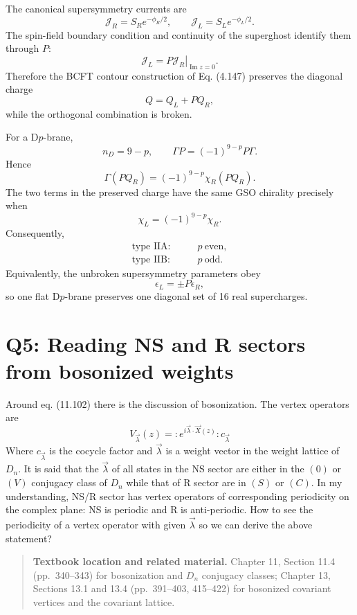 \documentclass[
  10pt,
  a4paper,
  openany]{book}
\begin{document}
The canonical supersymmetry currents are \[
\mathcal J_R=S_R e^{-\phi_R/2},
\qquad
\mathcal J_L=S_L e^{-\phi_L/2}.
\] The spin-field boundary condition and continuity of the superghost
identify them through \(P\): \[
\left.
\mathcal J_L
=P\mathcal J_R
\right|_{\operatorname{Im}z=0}.
\] Therefore the BCFT contour construction of Eq. (4.147) preserves the
diagonal charge \[
\boxed{
Q=Q_L+P Q_R,
}
\] while the orthogonal combination is broken.

For a D\(p\)-brane, \[
n_D=9-p,
\qquad
\Gamma P=(-1)^{9-p}P\Gamma.
\] Hence \[
\Gamma(P Q_R)
=(-1)^{9-p}\chi_R(P Q_R).
\] The two terms in the preserved charge have the same GSO chirality
precisely when \[
\boxed{
\chi_L=(-1)^{9-p}\chi_R.
}
\] Consequently, \[
\boxed{
\begin{aligned}
\text{type IIA:}&\qquad p\ \text{even},\\%
\text{type IIB:}&\qquad p\ \text{odd}.
\end{aligned}
}
\] Equivalently, the unbroken supersymmetry parameters obey \[
\boxed{
\epsilon_L=\pm P\epsilon_R,
}
\] so one flat D\(p\)-brane preserves one diagonal set of 16 real
supercharges.

\section{Q5: Reading NS and R sectors from bosonized
weights}\label{q5-reading-ns-and-r-sectors-from-bosonized-weights}

Around eq. (11.102) there is the discussion of bosonization. The vertex
operators are \[
V_{\vec{\lambda}}(z)=: e^{i\vec{\lambda}\cdot \vec{X}(z)}:c_{\vec{\lambda}}
\] Where \(c_{\vec{\lambda}}\) is the cocycle factor and
\(\vec{\lambda}\) is a weight vector in the weight lattice of \(D_{n}\).
It is said that the \(\vec{\lambda}\) of all states in the NS sector are
either in the \((0)\) or \((V)\) conjugacy class of \(D_{n}\) while that
of R sector are in \((S)\) or \((C)\). In my understanding, NS/R sector
has vertex operators of corresponding periodicity on the complex plane:
NS is periodic and R is anti-periodic. How to see the periodicity of a
vertex operator with given \(\vec{\lambda}\) so we can derive the above
statement?

\begin{quote}
\textbf{Textbook location and related material.} Chapter 11, Section
11.4 (pp.~340--343) for bosonization and \(D_n\) conjugacy classes;
Chapter 13, Sections 13.1 and 13.4 (pp.~391--403, 415--422) for
bosonized covariant vertices and the covariant lattice.
\end{quote}
\end{document}

